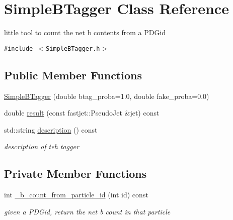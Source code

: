 \hypertarget{classSimpleBTagger}{
\section{Simple\-BTagger Class Reference}
\label{classSimpleBTagger}
}
little tool to count the net b contents from a PDGid  


{\tt \#include $<$Simple\-BTagger.h$>$}

\subsection*{Public Member Functions}
\begin{CompactItemize}
\item 
\hyperlink{classSimpleBTagger_0c20a732020b2235c5938af0c0a5b27a}{Simple\-BTagger} (double btag\_\-proba=1.0, double fake\_\-proba=0.0)
\item 
double \hyperlink{classSimpleBTagger_3874e44fae139f956eb80003c68b0d7b}{result} (const fastjet::Pseudo\-Jet \&jet) const 
\item 
\hypertarget{classSimpleBTagger_08acad2535b7717c10beae63735d6aad}{
std::string \hyperlink{classSimpleBTagger_08acad2535b7717c10beae63735d6aad}{description} () const }
\label{classSimpleBTagger_08acad2535b7717c10beae63735d6aad}

\begin{CompactList}\small\item\em description of teh tagger \item\end{CompactList}\end{CompactItemize}
\subsection*{Private Member Functions}
\begin{CompactItemize}
\item 
\hypertarget{classSimpleBTagger_6ac187be55e554860ce6dcd3a30b3054}{
int \hyperlink{classSimpleBTagger_6ac187be55e554860ce6dcd3a30b3054}{\_\-b\_\-count\_\-from\_\-particle\_\-id} (int id) const }
\label{classSimpleBTagger_6ac187be55e554860ce6dcd3a30b3054}

\begin{CompactList}\small\item\em given a PDGid, return the net b count in that particle \item\end{CompactList}\end{CompactItemize}
